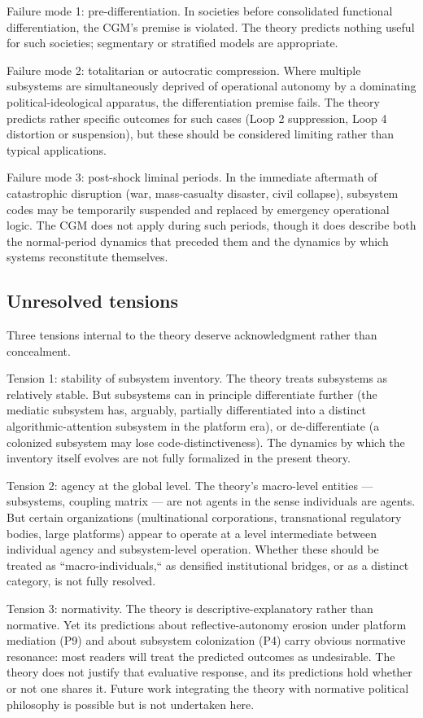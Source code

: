 \documentclass[12pt,a4paper]{article}
\begin{document}
Failure mode 1: pre-differentiation. In societies before consolidated functional differentiation, the CGM's premise is violated. The theory predicts nothing useful for such societies; segmentary or stratified models are appropriate.


Failure mode 2: totalitarian or autocratic compression. Where multiple subsystems are simultaneously deprived of operational autonomy by a dominating political-ideological apparatus, the differentiation premise fails. The theory predicts rather specific outcomes for such cases (Loop 2 suppression, Loop 4 distortion or suspension), but these should be considered limiting rather than typical applications.


Failure mode 3: post-shock liminal periods. In the immediate aftermath of catastrophic disruption (war, mass-casualty disaster, civil collapse), subsystem codes may be temporarily suspended and replaced by emergency operational logic. The CGM does not apply during such periods, though it does describe both the normal-period dynamics that preceded them and the dynamics by which systems reconstitute themselves.

\subsection{Unresolved tensions}

Three tensions internal to the theory deserve acknowledgment rather than concealment.


Tension 1: stability of subsystem inventory. The theory treats subsystems as relatively stable. But subsystems can in principle differentiate further (the mediatic subsystem has, arguably, partially differentiated into a distinct algorithmic-attention subsystem in the platform era), or de-differentiate (a colonized subsystem may lose code-distinctiveness). The dynamics by which the inventory itself evolves are not fully formalized in the present theory.


Tension 2: agency at the global level. The theory's macro-level entities --- subsystems, coupling matrix --- are not agents in the sense individuals are agents. But certain organizations (multinational corporations, transnational regulatory bodies, large platforms) appear to operate at a level intermediate between individual agency and subsystem-level operation. Whether these should be treated as ``macro-individuals,`` as densified institutional bridges, or as a distinct category, is not fully resolved.


Tension 3: normativity. The theory is descriptive-explanatory rather than normative. Yet its predictions about reflective-autonomy erosion under platform mediation (P9) and about subsystem colonization (P4) carry obvious normative resonance: most readers will treat the predicted outcomes as undesirable. The theory does not justify that evaluative response, and its predictions hold whether or not one shares it. Future work integrating the theory with normative political philosophy is possible but is not undertaken here.
\end{document}
